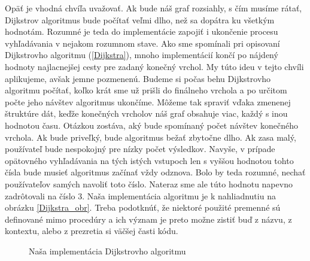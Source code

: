 Opäť je vhodná chvíľa uvažovať. Ak bude náš graf rozsiahly, s čím musíme rátať, Dijkstrov algoritmus bude počítať veľmi dlho, než sa dopátra ku všetkým hodnotám. Rozumné je teda do implementácie zapojiť i ukončenie procesu vyhľadávania v nejakom rozumnom stave. Ako sme spomínali pri opisovaní Dijkstrovho algoritmu (\ref{Dijkstra}), mnoho implementácií končí po nájdený hodnoty najlacnejšej cesty pre zadaný konečný vrchol. My túto ideu v tejto chvíli aplikujeme, avšak jemne pozmenenú. Budeme si počas behu Dijkstrovho algoritmu počítať, koľko krát sme už prišli do finálneho vrchola a po určitom počte jeho návštev algoritmus ukončíme. Môžeme tak spraviť vďaka zmenenej štruktúre dát, keďže konečných vrcholov náš graf obsahuje viac, každý s inou hodnotou času. Otázkou zostáva, aký bude spomínaný počet návštev konečného vrchola. Ak bude priveľký, bude algoritmus bežať zbytočne dlho. Ak zasa malý, používateľ bude nespokojný pre nízky počet výsledkov. Navyše, v prípade opätovného vyhľadávania na tých istých vstupoch len s vyššou hodnotou tohto čísla bude musieť algoritmus začínať vždy odznova. Bolo by teda rozumné, nechať používateľov samých navoliť toto číslo. Nateraz sme ale túto hodnotu napevno zadrôtovali na číslo $3$. Naša implementácia algoritmu je k nahliadnutiu na obrázku \ref{Dijkstra_obr}. Treba podotknúť, že niektoré použité premenné sú definované mimo procedúry a ich význam je preto možne zistiť buď z názvu, z kontextu, alebo z prezretia si väčšej časti kódu.\newline

\begin{figure}[H]
  \caption{Naša implementácia Dijkstrovho algoritmu}
  \label{Dijsktra_obr}
\end{figure}

